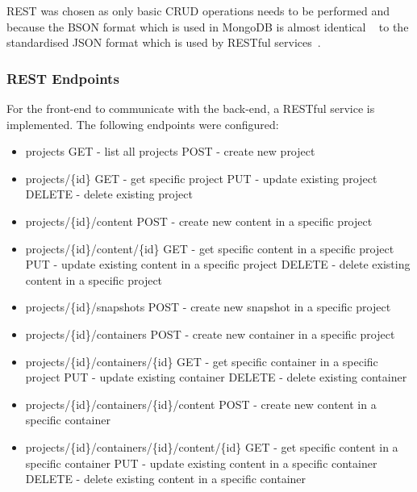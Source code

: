 \documentclass[a4paper,12pt]{article}
\newcounter{subsubsubsection}[subsubsection]
\begin{document}
REST was chosen as only basic CRUD operations needs to be performed and because the BSON format which is used in 
MongoDB is almost identical ~\cite{BSON} to the standardised JSON format which is used by RESTful services~\cite{JSON}. 

\subsubsection{REST Endpoints}
For the front-end to communicate with the back-end, a RESTful service is implemented.
The following endpoints were configured:

\begin{itemize}
  \item projects
      \subitem GET - list all projects
      \subitem POST - create new project
  \item projects/\{id\}
      \subitem GET - get specific project
      \subitem PUT - update existing project
      \subitem DELETE - delete existing project
  \item projects/\{id\}/content
      \subitem POST - create new content in a specific project 
  \item projects/\{id\}/content/\{id\}
      \subitem GET - get specific content in a specific project
      \subitem PUT - update existing content in a specific project
      \subitem DELETE - delete existing content in a specific project

  \item projects/\{id\}/snapshots
      \subitem POST - create new snapshot in a specific project 

  \item projects/\{id\}/containers
      \subitem POST - create new container in a specific project 
  \item projects/\{id\}/containers/\{id\}
      \subitem GET - get specific container in a specific project
      \subitem PUT - update existing container
      \subitem DELETE - delete existing container
  \item projects/\{id\}/containers/\{id\}/content
      \subitem POST - create new content in a specific container 
  \item projects/\{id\}/containers/\{id\}/content/\{id\}
      \subitem GET - get specific content in a specific container
      \subitem PUT - update existing content in a specific container
      \subitem DELETE - delete existing content in a specific container
\end{itemize}
\end{document}
